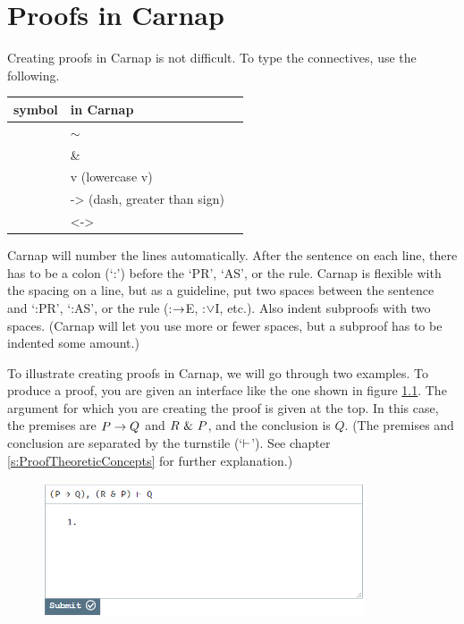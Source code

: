 \chapter{Proofs in Carnap}\label{s:Carnap-proofs}

Creating proofs in Carnap is not difficult. To type the connectives, use the following. 

	\begin{table}[h]
	\center
	\begin{tabular}{l l l}
	
	\textbf{symbol}&\textbf{in Carnap}&\\
	\hline
	\enot&$\sim$&\\
	\eand&\&&\\
	\eor&v (lowercase v)&\\
	\eif&-> (dash, greater than sign)&\\
	\eiff&<->&\\
	
	\end{tabular}
	\end{table}

\noindent Carnap will number the lines automatically. After the sentence on each line, there has to be a colon (`:') before the `PR', `AS', or the rule. Carnap is flexible with the spacing on a line, but as a guideline, put two spaces between the sentence and `:PR', `:AS', or the rule (:$\rightarrow$E, :$\vee$I, etc.). Also indent subproofs with two spaces. (Carnap will let you use more or fewer spaces, but a subproof has to be indented some amount.)

To illustrate creating proofs in Carnap, we will go through two examples. To produce a proof, you are given an interface like the one shown in figure \ref{fig:proof-1a}. The argument for which you are creating the proof is given at the top. In this case, the premises are $P \rightarrow Q$ and $R ~\&~ P$, and the conclusion is $Q$. (The premises and conclusion are separated by the turnstile (`$\vdash$'). See chapter \ref{s:ProofTheoreticConcepts} for further explanation.)

\begin{figure}
\centering
\includegraphics[height=4cm]{textbook--1a.PNG}
\caption{}
\label{fig:proof-1a}
\end{figure}

